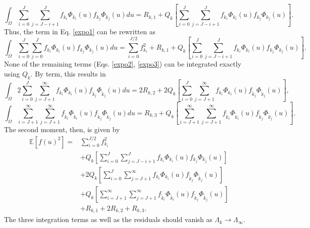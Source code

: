 \documentclass[11pt]{article}
\newcommand{\expv}[1]{\ensuremath{\mathbb{E}[ #1]}}
\begin{document}
\begin{equation}
\int_\Omega \sum_{i=0}^J\sum_{j=J-i+1}^{J} f_{k_i}\Phi_{k_i}(u)f_{k_j}\Phi_{k_j}(u) du = R_{k,1} + Q_k\left[\sum_{i=0}^J\sum_{j=J-i+1}^{J} f_{k_i}\Phi_{k_i}(u)f_{k_j}\Phi_{k_j}(u)\right].
\end{equation}
Thus, the term in Eq. \ref{expo1} can be rewritten as
\begin{equation}
\int_\Omega \sum_{i=0}^J\sum_{j=0}^J f_{k_i}\Phi_{k_i}(u)f_{k_j}\Phi_{k_j}(u)du = \sum_{i=0}^{J/2}f_{k_i}^2 + R_{k,1} + Q_k\left[\sum_{i=0}^J\sum_{j=J-i+1}^{J} f_{k_i}\Phi_{k_i}(u)f_{k_j}\Phi_{k_j}(u)\right].
\end{equation}
None of the remaining terms (Eqs. \ref{expo2}, \ref{expo3}) can be integrated exactly using $Q_k$.  By term, this results in
\begin{equation}
\int_\Omega 2\sum_{i=0}^J\sum_{j=J+1}^\infty f_{k_i}\Phi_{k_i}(u)f_{\tilde k_j}\Phi_{\tilde k_j}(u) du =2R_{k,2}+ 2Q_k\left[\sum_{i=0}^J\sum_{j=J+1}^\infty f_{k_i}\Phi_{k_i}(u)f_{\tilde k_j}\Phi_{\tilde k_j}(u)\right],
\end{equation}
\begin{equation}
\int_\Omega \sum_{i=J+1}^\infty \sum_{j=J+1}^\infty f_{\tilde k_i}\Phi_{\tilde k_i}(u)f_{\tilde k_j}\Phi_{\tilde k_j}(u) du = R_{k,3} + Q_k\left[\sum_{i=J+1}^\infty \sum_{j=J+1}^\infty f_{\tilde k_i}\Phi_{\tilde k_i}(u)f_{\tilde k_j}\Phi_{\tilde k_j}(u)\right].
\end{equation}
The second moment, then, is given by
\begin{align}
\expv{f(u)^2} =&  \sum_{i=0}^{J/2}f_{k_i}^2 \\
 & + Q_k\left[\sum_{i=0}^J\sum_{j=J-i+1}^{J} f_{k_i}\Phi_{k_i}(u)f_{k_j}\Phi_{k_j}(u)\right] \\
        &+ 2Q_k\left[\sum_{i=0}^J\sum_{j=J+1}^\infty f_{k_i}\Phi_{k_i}(u)f_{\tilde k_j}\Phi_{\tilde k_j}(u)\right] \\
        &+ Q_k\left[\sum_{i=J+1}^\infty \sum_{j=J+1}^\infty f_{\tilde k_i}\Phi_{\tilde k_i}(u)f_{\tilde k_j}\Phi_{\tilde k_j}(u)\right] \\
  & + R_{k,1} + 2R_{k,2} + R_{k,3}.
\end{align}
The three integration terms as well as the residuals should vanish as $\Lambda_k\to\Lambda_\infty$.
\end{document}
